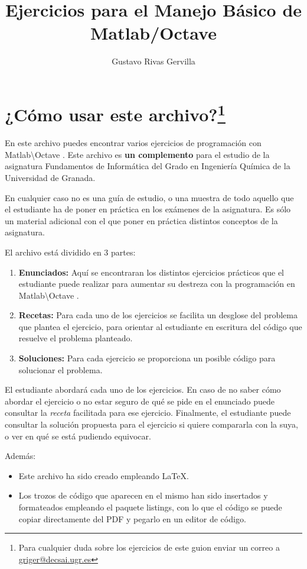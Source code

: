 \documentclass[spanish]{article}
\title{Ejercicios para el Manejo Básico de Matlab/Octave}
\author{Gustavo Rivas Gervilla}
\newcommand{\mt}{Matlab\textbackslash Octave }
\begin{document}
\maketitle

\newpage
\section*{¿Cómo usar este archivo?\footnote{Para cualquier duda sobre los ejercicios de este guion enviar un correo a \href{mailto:griger@decsai.ugr.es}{griger@decsai.ugr.es}}}

En este archivo puedes encontrar varios ejercicios de programación con \mt. Este archivo es \textbf{un complemento} para el estudio de la asignatura Fundamentos de Informática del Grado en Ingeniería Química de la Universidad de Granada.

En cualquier caso no es una guía de estudio, o una muestra de todo aquello que el estudiante ha de poner en práctica en los exámenes de la asignatura. Es sólo un material adicional con el que poner en práctica distintos conceptos de la asignatura.

El archivo está dividido en 3 partes:
\begin{enumerate}
\item \textbf{Enunciados:} Aquí se encontraran los distintos ejercicios prácticos que el estudiante puede realizar para aumentar su destreza con la programación en \mt.
\item \textbf{Recetas:} Para cada uno de los ejercicios se facilita un desglose del problema que plantea el ejercicio, para orientar al estudiante en escritura del código que resuelve el problema planteado.
\item \textbf{Soluciones:} Para cada ejercicio se proporciona un posible código para solucionar el problema.
\end{enumerate}

El estudiante abordará cada uno de los ejercicios. En caso de no saber cómo abordar el ejercicio o no estar seguro de qué se pide en el enunciado puede consultar la \textit{receta} facilitada para ese ejercicio. Finalmente, el estudiante puede consultar la solución propuesta para el ejercicio si quiere compararla con la suya, o ver en qué se está pudiendo equivocar.

Además:

\begin{itemize}
\item Este archivo ha sido creado empleando \LaTeX.
\item Los trozos de código que aparecen en el mismo han sido insertados y formateados empleando el paquete listings, con lo que el código se puede copiar directamente del PDF y pegarlo en un editor de código.
\end{itemize}
\newpage
\end{document}
